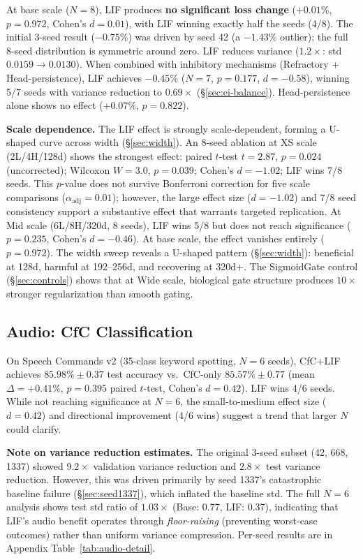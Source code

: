 \documentclass[11pt]{article}
\begin{document}
At base scale ($N{=}8$), LIF produces \textbf{no significant loss change} ($+0.01\%$, $p = 0.972$, Cohen's $d = 0.01$), with LIF winning exactly half the seeds (4/8). The initial 3-seed result ($-0.75\%$) was driven by seed 42 (a $-1.43\%$ outlier); the full 8-seed distribution is symmetric around zero. LIF reduces variance ($1.2\times$: std $0.0159 \to 0.0130$). When combined with inhibitory mechanisms (Refractory + Head-persistence), LIF achieves $-0.45\%$ ($N{=}7$, $p = 0.177$, $d = -0.58$), winning 5/7 seeds with variance reduction to $0.69\times$ (\S\ref{sec:ei-balance}). Head-persistence alone shows no effect ($+0.07\%$, $p = 0.822$).

\textbf{Scale dependence.} The LIF effect is strongly scale-dependent, forming a U-shaped curve across width (\S\ref{sec:width}). An 8-seed ablation at XS scale (2L/4H/128d) shows the strongest effect: paired $t$-test $t = 2.87$, $p = 0.024$ (uncorrected); Wilcoxon $W = 3.0$, $p = 0.039$; Cohen's $d = -1.02$; LIF wins 7/8 seeds. This $p$-value does not survive Bonferroni correction for five scale comparisons ($\alpha_{\text{adj}} = 0.01$); however, the large effect size ($d = -1.02$) and 7/8 seed consistency support a substantive effect that warrants targeted replication. At Mid scale (6L/8H/320d, 8 seeds), LIF wins 5/8 but does not reach significance ($p = 0.235$, Cohen's $d = -0.46$). At base scale, the effect vanishes entirely ($p = 0.972$). The width sweep reveals a U-shaped pattern (\S\ref{sec:width}): beneficial at 128d, harmful at 192--256d, and recovering at 320d+. The SigmoidGate control (\S\ref{sec:controls}) shows that at Wide scale, biological gate structure produces $10\times$ stronger regularization than smooth gating.

\subsection{Audio: CfC Classification}
\label{sec:audio-results}

On Speech Commands v2 (35-class keyword spotting, $N = 6$ seeds), CfC+LIF achieves $85.98\% \pm 0.37$ test accuracy vs.\ CfC-only $85.57\% \pm 0.77$ (mean $\Delta = +0.41\%$, $p = 0.395$ paired $t$-test, Cohen's $d = 0.42$). LIF wins 4/6 seeds. While not reaching significance at $N = 6$, the small-to-medium effect size ($d = 0.42$) and directional improvement (4/6 wins) suggest a trend that larger $N$ could clarify.

\textbf{Note on variance reduction estimates.} The original 3-seed subset (42, 668, 1337) showed $9.2\times$ validation variance reduction and $2.8\times$ test variance reduction. However, this was driven primarily by seed 1337's catastrophic baseline failure (\S\ref{sec:seed1337}), which inflated the baseline std. The full $N{=}6$ analysis shows test std ratio of $1.03\times$ (Base: 0.77, LIF: 0.37), indicating that LIF's audio benefit operates through \emph{floor-raising} (preventing worst-case outcomes) rather than uniform variance compression. Per-seed results are in Appendix Table~\ref{tab:audio-detail}.
\end{document}
